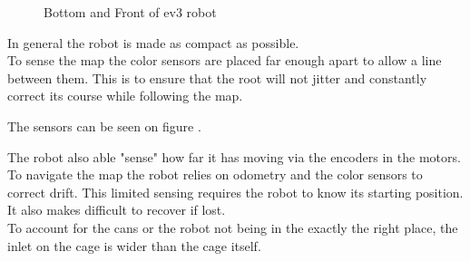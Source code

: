 \documentclass[../../main.tex]{subfiles}
\begin{document}
\begin{figure}[h]
	\centering

	\caption{Bottom and Front of ev3 robot}
	\label{fig:front_and_bottom}
\end{figure}


In general the robot is made as compact as possible.\\


To sense the map the color sensors are placed far enough apart to allow a line between them.
This is to ensure that the root will not jitter and constantly correct its course while
following the map.

The sensors can be seen on figure .

The robot also able "sense" how far it has moving via the encoders in the motors.\\

To navigate the map the robot relies on odometry and the color sensors to correct drift.
This limited sensing requires the robot to know its starting position. It also makes difficult
to recover if lost.\\

To account for the cans or the robot  not being in the exactly the right place, the inlet on the cage
is wider than the cage itself.
	
\end{document}
